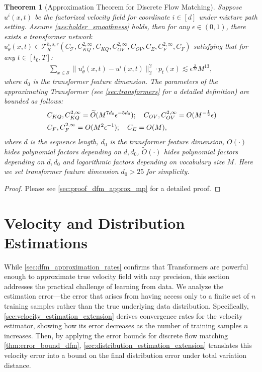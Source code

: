 \documentclass[12pt]{article}
\numberwithin{equation}{section}
\let\tilde\widetilde
\newcommand{\wt}{\widetilde}
\renewcommand{\tilde}{\wt}
\theoremstyle{theoremstyle}
\newtheorem{theorem}{Theorem}[section]
\numberwithin{equation}{section}
\numberwithin{theorem}{section}
\numberwithin{proposition}{section}
\numberwithin{definition}{section}
\numberwithin{lemma}{section}
\numberwithin{assumption}{section}
\numberwithin{remark}{section}
\begin{document}
\begin{theorem}[Approximation Theorem for Discrete Flow Matching]
\label{thm:approximation_theorem_discrete_mixture_path}
Suppose $u^i(x,t)$ be the factorized velocity field for coordinate $i \in [d]$ under mixture path setting.
Assume \cref{ass:holder_smoothness} holds,
then for any $\epsilon \in (0,1)$, there exists a transformer network $u^i_\theta(x,t)\in\mathcal{T}^{h,s,r}_R(C_\mathcal{T},C^{2,\infty}_{KQ},C_{KQ},C^{2,\infty}_{OV},C_{OV},C_{E},C^{2,\infty}_{F},C_{F})$ satisfying that for any $t\in[t_0,T]$:
\begin{align*}
    \sum_{x\in \mathcal{S}}\|u^i_\theta(x,t)-u^i(x,t)\|^2_2\cdot p_t(x) \lesssim  \epsilon^\frac{2}{M}M^{13},
\end{align*}
where $d_0$ is the transformer feature dimension.
The parameters of the approximating Transformer (see \cref{sec:transformers} for a detailed definition) are bounded as follows: 
\begin{align*}
    & ~C_{KQ},C^{2,\infty}_{KQ}=\tilde{O}(M^{7d_0}\epsilon^{-5d_0});\quad
    C_{OV},C^{2,\infty}_{OV}=O(M^{-\frac{1}{2}}\epsilon) \notag\\
    & ~C_{F},C^{2,\infty}_{F}=O(M^2\epsilon^{-1});\quad
    C_E=O(M),
\end{align*}
where $d$ is the sequence length, $d_0$ is the transformer feature dimension, $O(\cdot)$ hides polynomial factors depending on $d,d_0$, $\tilde{O}(\cdot)$ hides polynomial factors depending on $d,d_0$ and logarithmic factors depending on vocabulary size $M$.
Here we set transformer feature dimension $d_0>25$ for simplicity.
\end{theorem}


\begin{proof}
    Please see \cref{sec:proof_dfm_approx_mp} for a detailed proof.
\end{proof}


\section{Velocity and Distribution Estimations}
\label{sec:estimation_main}


While \cref{sec:dfm_approximation_rates} confirms that Transformers are powerful enough to approximate true velocity field with any precision, this section addresses the practical challenge of learning from data. 
We analyze the estimation error—the error that arises from having access only to a finite set of $n$ training samples rather than the true underlying data distribution. 
Specifically, \cref{sec:velocity_estimation_extension} derives convergence rates for the velocity estimator, showing how its error decreases as the number of training samples $n$ increases.
Then, by applying the error bounds for discrete flow matching \cref{thm:error_bound_dfm}, 
 \cref{sec:distribution_estimation_extension} 
translates this velocity error into a bound on the final distribution error under total variation distance.
\end{document}
